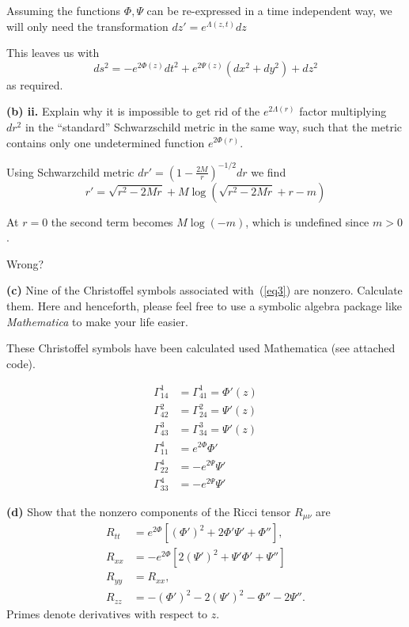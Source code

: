 \documentclass[a4paper]{article} %
\begin{document}
Assuming the functions $\Phi,\Psi$ can be re-expressed in a time independent way, we will only need the transformation $dz'=e^{\Lambda(z,t)}dz$

This leaves us with
\begin{equation}
ds^2=-e^{2\Phi(z)} dt^2+e^{2\Psi(z)}(dx^2+dy^2)+dz^2
\end{equation}
as required.



\begin{framed}
\textbf{(b) ii.} Explain why it is impossible to get rid of the $e^{2\Lambda(r)}$ factor multiplying $dr^2$ in the ``standard'' Schwarzschild metric in the same way, such that the metric contains only one undetermined function $e^{2\Phi(r)}$.
\end{framed}

Using Schwarzchild metric $dr'=\left(1-\frac{2M}{r}\right)^{-1/2}dr$ we find
\begin{equation}
r'=\sqrt{r^2-2Mr}+M\log\left(\sqrt{r^2-2Mr}+r-m\right)
\end{equation}

At $r=0$ the second term becomes $M\log(-m)$, which is undefined since $m>0$.

{\huge Wrong?}

\begin{framed}
\textbf{(c)} Nine of the Christoffel symbols associated with~(\ref{eq3}) are nonzero. Calculate them. Here and henceforth, please feel free to use a symbolic algebra package like \emph{Mathematica} to make your life easier.
\end{framed}

These Christoffel symbols have been calculated used Mathematica (see attached code).

\begin{align}
\Gamma^{1}_{14}&=\Gamma^{1}_{41}=\Phi'(z)\\
\Gamma^{2}_{42}&=\Gamma^{2}_{24}=\Psi'(z)\\
\Gamma^{3}_{43}&=\Gamma^{3}_{34}=\Psi'(z)\\
\Gamma^{4}_{11}&=e^{2\Phi}\Phi'\\
\Gamma^{4}_{22}&=-e^{2\Psi}\Psi'\\
\Gamma^{4}_{33}&=-e^{2\Psi}\Psi'
\end{align}

\begin{framed}
\textbf{(d)} Show that the nonzero components of the Ricci tensor $R_{\mu\nu}$ are
\begin{align}
R_{tt}&=e^{2\Phi}[(\Phi')^2+2\Phi' \Psi' +\Phi''],\\
R_{xx}&=-e^{2\Phi}[2(\Psi')^2+\Psi' \Phi' + \Psi'']\\
R_{yy}&=R_{xx},\\
R_{zz}&=-(\Phi')^2-2(\Psi')^2-\Phi''-2\Psi''.
\end{align}
Primes denote derivatives with respect to $z$.
\end{framed}
\end{document}
